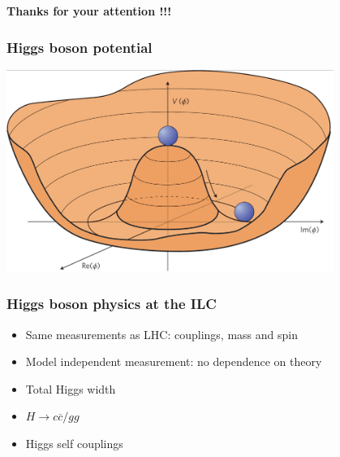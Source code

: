 \documentclass{beamer}
\begin{document}
\begin{frame}
  \begin{center}
    \huge
    \textbf{Thanks for your attention !!!}
  \end{center}
\end{frame}

  \appendix
  \setcounter{lastframe}{\insertframenumber}

  
  \begin{frame}[plain]
    \frametitle{Higgs boson potential}

    \begin{center}
      \includegraphics[width = 0.8\textwidth]{Pictures/higgsPotential.png}
    \end{center}
  \end{frame}

  
  \begin{frame}[plain]
    \frametitle{Higgs boson physics at the ILC}

    \begin{itemize}
      \item Same measurements as LHC: couplings, mass and spin
      \item Model independent measurement: no dependence on theory
      \item Total Higgs width
      \item $H \rightarrow c\overline{c}/gg$
      \item Higgs self couplings
    \end{itemize}
  \end{frame}
\end{document}

